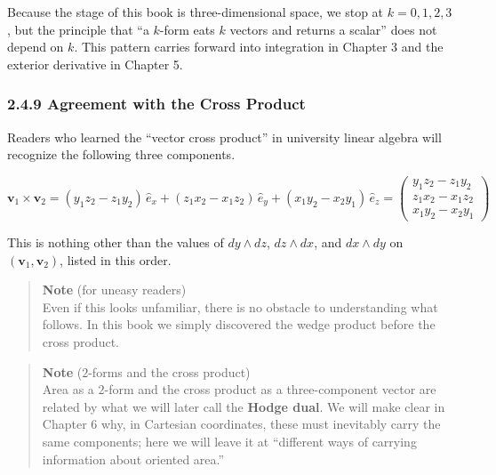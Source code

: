 \documentclass[a4paper,12pt,openany]{book}
\begin{document}
Because the stage of this book is three-dimensional space, we stop at
\(k=0,1,2,3\), but the principle that ``a \(k\)-form eats \(k\) vectors
and returns a scalar'' does not depend on \(k\). This pattern carries
forward into integration in Chapter 3 and the exterior derivative in
Chapter 5.

\hypertarget{agreement-with-the-cross-product}{%
\subsubsection{2.4.9 Agreement with the Cross
Product}\label{agreement-with-the-cross-product}}

Readers who learned the ``vector cross product'' in university linear
algebra will recognize the following three components.

\[\mathbf{v}_1 \times \mathbf{v}_2 = (y_1 z_2 - z_1 y_2)\,\hat{e}_x + (z_1 x_2 - x_1 z_2)\,\hat{e}_y + (x_1 y_2 - x_2 y_1)\,\hat{e}_z = \begin{pmatrix} y_1 z_2 - z_1 y_2 \\ z_1 x_2 - x_1 z_2 \\ x_1 y_2 - x_2 y_1 \end{pmatrix}\]

This is nothing other than the values of \(dy \wedge dz\),
\(dz \wedge dx\), and \(dx \wedge dy\) on
\((\mathbf{v}_1,\mathbf{v}_2)\), listed in this order.

\begin{quote}
\textbf{Note} (for uneasy readers)\\
Even if this looks unfamiliar, there is no obstacle to understanding
what follows. In this book we simply discovered the wedge product before
the cross product.
\end{quote}

\begin{quote}
\textbf{Note} (\(2\)-forms and the cross product)\\
Area as a \(2\)-form and the cross product as a three-component vector
are related by what we will later call the \textbf{Hodge dual}. We will
make clear in Chapter 6 why, in Cartesian coordinates, these must
inevitably carry the same components; here we will leave it at
``different ways of carrying information about oriented area.''
\end{quote}

\par\vspace{0.35em}\par
\end{document}
